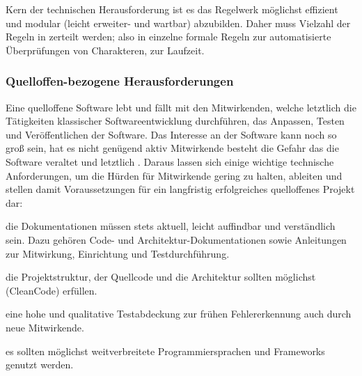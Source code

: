 Kern der technischen Herausforderung ist es das Regelwerk möglichst effizient und modular (leicht erweiter- und wartbar) abzubilden.
Daher muss Vielzahl der Regeln in  zerteilt werden;
also in einzelne formale Regeln zur automatisierte Überprüfungen von Charakteren, zur Laufzeit.


\subsubsection{Quelloffen-bezogene Herausforderungen}
\label{subsubsec:quelloffen-bezogene-herausforderungen}

Eine quelloffene Software lebt und fällt mit den \sog Mitwirkenden, welche letztlich die Tätigkeiten klassischer Softwareentwicklung durchführen, \zB das Anpassen, Testen und Veröffentlichen der Software.
Das Interesse an der Software kann noch so groß sein, hat es nicht genügend aktiv Mitwirkende besteht die Gefahr das die Software veraltet und letztlich .
Daraus lassen sich einige wichtige technische Anforderungen, um die Hürden für Mitwirkende gering zu halten, ableiten und stellen damit Voraussetzungen für ein langfristig erfolgreiches quelloffenes Projekt dar:
\begin{inparaenum}
    [a)]
    \item die Dokumentationen müssen stets aktuell, leicht auffindbar und verständlich sein.
    Dazu gehören \uA Code- und Architektur-Dokumentationen sowie Anleitungen zur Mitwirkung, Einrichtung und Testdurchführung.
    \item die Projektstruktur, der Quellcode und die Architektur sollten möglichst  (\zB CleanCode) erfüllen.
    \item eine hohe und qualitative Testabdeckung zur frühen Fehlererkennung auch durch neue Mitwirkende.
    \item es sollten möglichst weitverbreitete Programmiersprachen und Frameworks genutzt werden.
\end{inparaenum}


